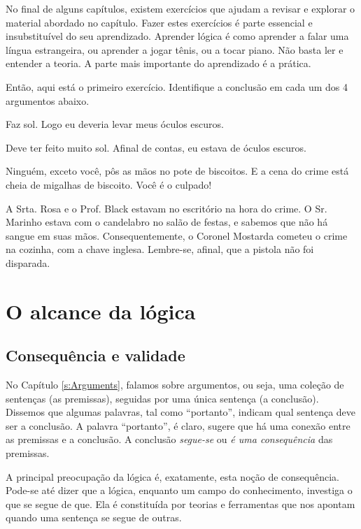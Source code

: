 \practiceproblems
No final de alguns capítulos, existem exercícios que ajudam a revisar e explorar 
o material abordado no capítulo.
Fazer estes exercícios é parte essencial e insubstituível do seu aprendizado.
Aprender lógica é como aprender a falar uma língua estrangeira, ou aprender a jogar tênis, ou a tocar piano.
Não basta ler e entender a teoria.
A parte mais importante do aprendizado é a prática.

\medskip


Então, aqui está o primeiro exercício. Identifique a conclusão em cada um dos 4 argumentos abaixo.
\begin{earg}
	\item Faz sol. Logo eu deveria levar meus óculos escuros.
	\item Deve ter feito muito sol. Afinal de contas, eu estava de óculos escuros.
	\item Ninguém, exceto você, pôs as mãos no pote de biscoitos.
	E a cena do crime está cheia de migalhas de biscoito.
	Você é o culpado!
	\item A Srta. Rosa e o Prof. Black estavam no escritório na hora do crime.
	O Sr. Marinho estava com o candelabro no salão de festas,
	e sabemos que não há sangue em suas mãos.
	Consequentemente, o Coronel Mostarda cometeu o crime na cozinha, com a chave inglesa.
	Lembre-se, afinal, que a pistola não foi disparada.
\end{earg}



\chapter{O alcance da lógica}
\label{s:Valid}

\section{Consequência e validade}

No Capítulo \ref{s:Arguments}, falamos sobre argumentos, ou seja, uma coleção de sentenças (as premissas), seguidas por uma única sentença (a conclusão).
Dissemos que algumas palavras, tal como ``portanto'', indicam qual sentença deve ser a conclusão.
A palavra ``portanto'', é claro, sugere que há uma conexão entre as premissas e a conclusão.
A conclusão \emph{segue-se} ou \emph{é uma consequência} das premissas.

A principal preocupação da lógica é, exatamente, esta noção de consequência.
Pode-se até dizer que a lógica, enquanto um campo do conhecimento, investiga o que se segue de que.
Ela é constituída por teorias e ferramentas que nos apontam quando uma sentença se segue de outras.

